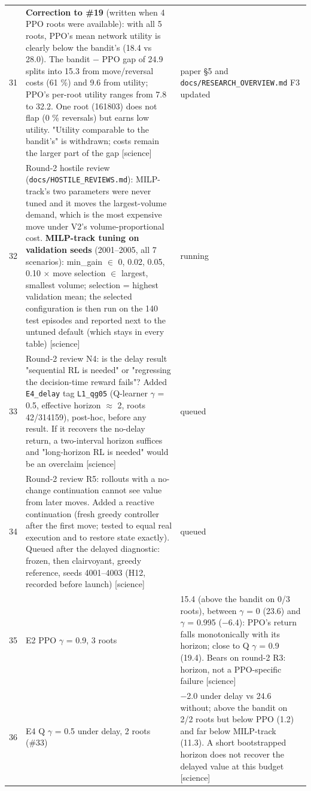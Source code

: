 {\begin{longtable}{@{}rp{}p{}@{}}
31 & \textbf{Correction to \#19} (written when 4 PPO roots were available): with all 5 roots, PPO's mean network utility is clearly below the bandit's (18.4 vs 28.0). The bandit $-$ PPO gap of 24.9 splits into 15.3 from move/reversal costs (61 \%) and 9.6 from utility; PPO's per-root utility ranges from 7.8 to 32.2. One root (161803) does not flap (0 \% reversals) but earns low utility. "Utility comparable to the bandit's" is withdrawn; costs remain the larger part of the gap [science] & paper \S{}5 and \texttt{docs/\allowbreak{}RESEARCH\_\allowbreak{}OVERVIEW.\allowbreak{}md} F3 updated \\
32 & Round-2 hostile review (\texttt{docs/\allowbreak{}HOSTILE\_\allowbreak{}REVIEWS.\allowbreak{}md}): MILP-track's two parameters were never tuned and it moves the largest-volume demand, which is the most expensive move under V2's volume-proportional cost. \textbf{MILP-track tuning on validation seeds} (2001--2005, all 7 scenarios): min\_gain $\in$ {0, 0.02, 0.05, 0.10} $\times$ move selection $\in$ {largest, smallest volume}; selection = highest validation mean; the selected configuration is then run on the 140 test episodes and reported next to the untuned default (which stays in every table) [science] & running \\
33 & Round-2 review N4: is the delay result "sequential RL is needed" or "regressing the decision-time reward fails"? Added \texttt{E4\_\allowbreak{}delay} tag \texttt{L1\_\allowbreak{}qg05} (Q-learner $\gamma$ = 0.5, effective horizon $\approx$ 2, roots 42/314159), post-hoc, before any result. If it recovers the no-delay return, a two-interval horizon suffices and "long-horizon RL is needed" would be an overclaim [science] & queued \\
34 & Round-2 review R5: rollouts with a no-change continuation cannot see value from later moves. Added a reactive continuation (fresh greedy controller after the first move; tested to equal real execution and to restore state exactly). Queued after the delayed diagnostic: frozen, then clairvoyant, greedy reference, seeds 4001--4003 (H12, recorded before launch) [science] & queued \\
35 & E2 PPO $\gamma$ = 0.9, 3 roots & 15.4 (above the bandit on 0/3 roots), between $\gamma$ = 0 (23.6) and $\gamma$ = 0.995 ($-$6.4): PPO's return falls monotonically with its horizon; close to Q $\gamma$ = 0.9 (19.4). Bears on round-2 R3: horizon, not a PPO-specific failure [science] \\
36 & E4 Q $\gamma$ = 0.5 under delay, 2 roots (\#33) & $-$2.0 under delay vs 24.6 without; above the bandit on 2/2 roots but below PPO (1.2) and far below MILP-track (11.3). A short bootstrapped horizon does not recover the delayed value at this budget [science] \\

\end{longtable}}
